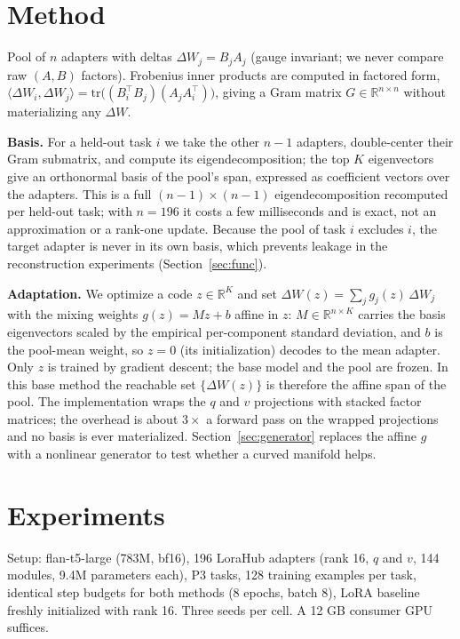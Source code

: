 \documentclass[10pt]{article}
\newcommand{\dW}{\Delta W}
\begin{document}
\section{Method}
\label{sec:method}
Pool of $n$ adapters with deltas $\dW_j = B_j A_j$ (gauge invariant; we never
compare raw $(A,B)$ factors). Frobenius inner products are computed in factored
form, $\langle \dW_i, \dW_j \rangle = \mathrm{tr}\big((B_i^\top B_j)(A_j
A_i^\top)\big)$, giving a Gram matrix $G \in \mathbb{R}^{n \times n}$ without
materializing any $\dW$.

\textbf{Basis.} For a held-out task $i$ we take the other $n{-}1$ adapters,
double-center their Gram submatrix, and compute its eigendecomposition; the
top $K$ eigenvectors give an orthonormal basis of the pool's span, expressed as
coefficient vectors over the adapters. This is a full $(n{-}1)\times(n{-}1)$
eigendecomposition recomputed per held-out task; with $n=196$ it costs a few
milliseconds and is exact, not an approximation or a rank-one update. Because
the pool of task $i$ excludes $i$, the target adapter is never in its own basis,
which prevents leakage in the reconstruction experiments (Section~\ref{sec:func}).

\textbf{Adaptation.} We optimize a code $z \in \mathbb{R}^K$ and set
$\dW(z) = \sum_j g_j(z)\, \dW_j$ with the mixing weights $g(z) = M z + b$ affine
in $z$: $M \in \mathbb{R}^{n \times K}$ carries the basis eigenvectors scaled by
the empirical per-component standard deviation, and $b$ is the pool-mean weight,
so $z=0$ (its initialization) decodes to the mean adapter. Only $z$ is trained
by gradient descent; the base model and the pool are frozen. In this base method
the reachable set $\{\dW(z)\}$ is therefore the affine span of the pool. The
implementation wraps the $q$ and $v$ projections with stacked factor matrices;
the overhead is about $3\times$ a forward pass on the wrapped projections and no
basis is ever materialized. Section~\ref{sec:generator} replaces the affine
$g$ with a nonlinear generator to test whether a curved manifold helps.

\section{Experiments}
Setup: flan-t5-large (783M, bf16), 196 LoraHub adapters (rank 16, $q$ and $v$,
144 modules, 9.4M parameters each), P3 tasks, 128 training examples per task,
identical step budgets for both methods (8 epochs, batch 8), LoRA baseline
freshly initialized with rank 16. Three seeds per cell. A 12 GB consumer GPU
suffices.
\end{document}
